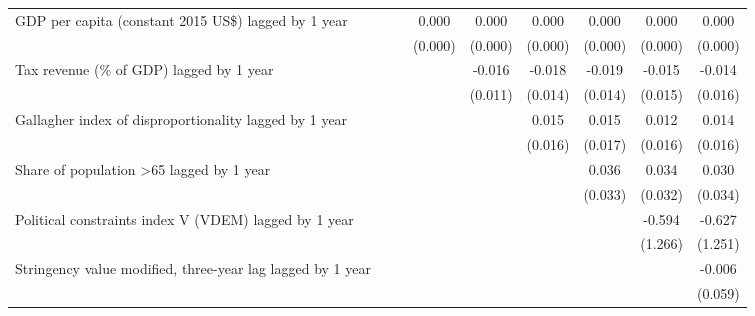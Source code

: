 \begin{tabular}{lcccccccc}
   GDP per capita (constant 2015 US\$) lagged by 1 year         &               &               & 0.000         & 0.000         & 0.000          & 0.000          & 0.000          & 0.000\\   
                                                                &               &               & (0.000)       & (0.000)       & (0.000)        & (0.000)        & (0.000)        & (0.000)\\   
   Tax revenue (\% of GDP) lagged by 1 year                     &               &               &               & -0.016        & -0.018         & -0.019         & -0.015         & -0.014\\   
                                                                &               &               &               & (0.011)       & (0.014)        & (0.014)        & (0.015)        & (0.016)\\   
   Gallagher index of disproportionality lagged by 1 year       &               &               &               &               & 0.015          & 0.015          & 0.012          & 0.014\\   
                                                                &               &               &               &               & (0.016)        & (0.017)        & (0.016)        & (0.016)\\   
   Share of population >65 lagged by 1 year                     &               &               &               &               &                & 0.036          & 0.034          & 0.030\\   
                                                                &               &               &               &               &                & (0.033)        & (0.032)        & (0.034)\\   
   Political constraints index V (VDEM) lagged by 1 year        &               &               &               &               &                &                & -0.594         & -0.627\\   
                                                                &               &               &               &               &                &                & (1.266)        & (1.251)\\   
   Stringency value modified, three-year lag lagged by 1 year   &               &               &               &               &                &                &                & -0.006\\   
                                                                &               &               &               &               &                &                &                & (0.059)\\   

\end{tabular}
